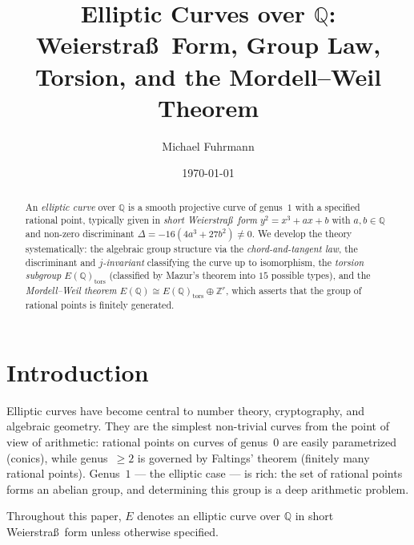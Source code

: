 \documentclass[12pt,a4paper]{amsart}
\theoremstyle{definition}
\newcommand{\Z}{\mathbb{Z}}
\newcommand{\Q}{\mathbb{Q}}
\begin{document}

\title{Elliptic Curves over \texorpdfstring{$\Q$}{Q}:\\
       Weierstra\ss\ Form, Group Law, Torsion, and the Mordell--Weil Theorem}

\author{Michael Fuhrmann}
\address{Specialist Mathematics Project, Build 84}
\date{\today}

\begin{abstract}
An \emph{elliptic curve} over $\Q$ is a smooth projective curve of genus~$1$
with a specified rational point, typically given in \emph{short Weierstra\ss\ form}
$y^2 = x^3 + ax + b$ with $a, b \in \Q$ and non-zero discriminant
$\Delta = -16(4a^3 + 27b^2) \ne 0$.
We develop the theory systematically:
the algebraic group structure via the \emph{chord-and-tangent law},
the discriminant and \emph{$j$-invariant} classifying the curve up to isomorphism,
the \emph{torsion subgroup} $E(\Q)_{\mathrm{tors}}$ (classified by
Mazur's theorem into $15$ possible types),
and the \emph{Mordell--Weil theorem} $E(\Q) \cong E(\Q)_{\mathrm{tors}} \oplus \Z^r$,
which asserts that the group of rational points is finitely generated.
\end{abstract}

\maketitle
\tableofcontents

\section{Introduction}

Elliptic curves have become central to number theory, cryptography, and
algebraic geometry.  They are the simplest non-trivial curves from the
point of view of arithmetic: rational points on curves of genus~$0$
are easily parametrized (conics), while genus~$\ge 2$ is governed by
Faltings' theorem (finitely many rational points).  Genus~$1$ --- the elliptic
case --- is rich: the set of rational points forms an abelian group,
and determining this group is a deep arithmetic problem.

Throughout this paper, $E$ denotes an elliptic curve over $\Q$ in short
Weierstra\ss\ form unless otherwise specified.
\end{document}
